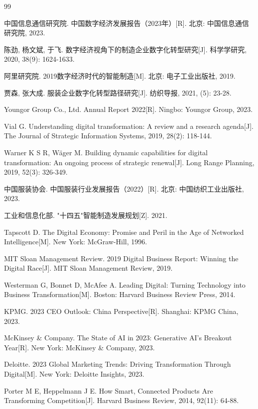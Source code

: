 \documentclass[12pt,a4paper]{article}
\begin{document}
\begin{thebibliography}{99}

 中国信息通信研究院. 中国数字经济发展报告（2023年）[R]. 北京: 中国信息通信研究院, 2023.

 陈劲, 杨文斌, 于飞. 数字经济视角下的制造企业数字化转型研究[J]. 科学学研究, 2020, 38(9): 1624-1633.

 阿里研究院. 2019数字经济时代的智能制造[M]. 北京: 电子工业出版社, 2019.

 贾森, 张大成. 服装企业数字化转型路径研究[J]. 纺织导报, 2021, (5): 23-28.

 Youngor Group Co., Ltd. Annual Report 2022[R]. Ningbo: Youngor Group, 2023.

 Vial G. Understanding digital transformation: A review and a research agenda[J]. The Journal of Strategic Information Systems, 2019, 28(2): 118-144.

 Warner K S R, Wäger M. Building dynamic capabilities for digital transformation: An ongoing process of strategic renewal[J]. Long Range Planning, 2019, 52(3): 326-349.

 中国服装协会. 中国服装行业发展报告（2022）[R]. 北京: 中国纺织工业出版社, 2023.

 工业和信息化部. "十四五"智能制造发展规划[Z]. 2021.

 Tapscott D. The Digital Economy: Promise and Peril in the Age of Networked Intelligence[M]. New York: McGraw-Hill, 1996.

 MIT Sloan Management Review. 2019 Digital Business Report: Winning the Digital Race[J]. MIT Sloan Management Review, 2019.

 Westerman G, Bonnet D, McAfee A. Leading Digital: Turning Technology into Business Transformation[M]. Boston: Harvard Business Review Press, 2014.

 KPMG. 2023 CEO Outlook: China Perspective[R]. Shanghai: KPMG China, 2023.

 McKinsey \& Company. The State of AI in 2023: Generative AI's Breakout Year[R]. New York: McKinsey \& Company, 2023.

 Deloitte. 2023 Global Marketing Trends: Driving Transformation Through Digital[M]. New York: Deloitte Insights, 2023.

 Porter M E, Heppelmann J E. How Smart, Connected Products Are Transforming Competition[J]. Harvard Business Review, 2014, 92(11): 64-88.


\end{thebibliography}
\end{document}
